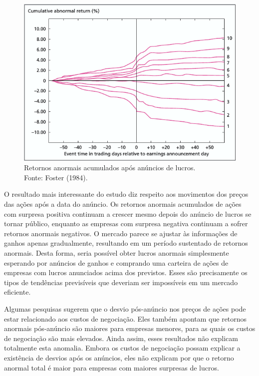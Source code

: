 \begin{figure}[h]
	\centering
	\includegraphics[width=1\linewidth]{figs/fig_gros_returns}
	\caption[Retornos anormais após anúncios de lucros.]{Retornos anormais acumulados após anúncios de lucros.\\ Fonte: Foster (1984).}
	\label{fig:figgrosreturns}
\end{figure}

O resultado mais interessante do estudo diz respeito aos movimentos dos preços das ações após a data do anúncio. Os retornos anormais acumulados de ações com surpresa positiva continuam a crescer mesmo depois do anúncio de lucros se tornar público, enquanto as empresas com surpresa negativa continuam a sofrer retornos anormais negativos. O mercado parece se ajustar às informações de ganhos apenas gradualmente, resultando em um período sustentado de retornos anormais. Desta forma, seria possível obter lucros anormais simplesmente esperando por anúncios de ganhos e comprando uma carteira de ações de empresas com lucros anunciados acima dos previstos. Esses são precisamente os tipos de tendências  previsíveis que deveriam ser impossíveis em um mercado eficiente.

Algumas pesquisas sugerem que o desvio pós-anúncio nos preços de ações pode estar relacionado aos custos de negociação. Eles também apontam que retornos anormais pós-anúncio são maiores para empresas menores, para as quais os custos de negociação são mais elevados. Ainda assim, esses resultados não explicam totalmente esta anomalia. Embora os custos de negociação possam explicar a existência de desvios após os anúncios, eles não explicam por que o retorno anormal total é maior para empresas com maiores surpresas de lucros.

